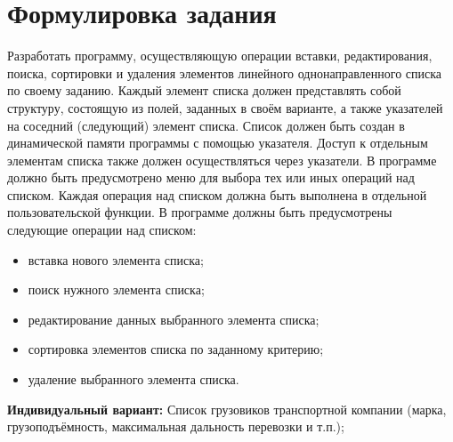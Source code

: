 \section*{Формулировка задания}

Разработать программу, осуществляющую операции вставки,
редактирования, поиска, сортировки и удаления элементов линейного
однонаправленного списка по своему заданию.
Каждый элемент списка должен представлять собой структуру,
состоящую из полей, заданных в своём варианте, а также указателей на
соседний (следующий) элемент списка.
Список должен быть создан в динамической памяти программы с
помощью указателя.
Доступ к отдельным элементам списка также должен
осуществляться через указатели.
В программе должно быть предусмотрено меню для выбора тех или
иных операций над списком.
Каждая операция над списком должна быть
выполнена в отдельной пользовательской функции.
В программе должны быть предусмотрены следующие операции над
списком:

\begin{itemize}
    \item вставка нового элемента списка;
    \item поиск нужного элемента списка;
    \item редактирование данных выбранного элемента списка;
    \item сортировка элементов списка по заданному критерию;
    \item удаление выбранного элемента списка.
\end{itemize}

\textbf{Индивидуальный вариант:}
Список грузовиков транспортной компании (марка, грузоподъёмность,
максимальная дальность перевозки и
т.п.);
